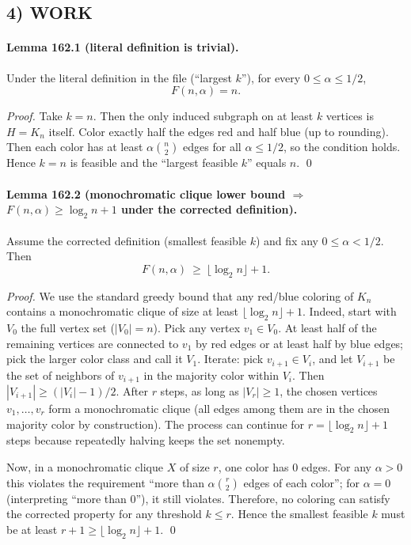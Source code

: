 \subsection*{4) WORK}
\paragraph{Lemma 162.1 (literal definition is trivial).}
Under the literal definition in the file (``largest $k$''), for every $0\le\alpha\le 1/2$,
\[
F(n,\alpha)=n.
\]

\textit{Proof.}
Take $k=n$. Then the only induced subgraph on at least $k$ vertices is $H=K_n$ itself.
Color exactly half the edges red and half blue (up to rounding). Then each color has at least $\alpha\binom{n}{2}$ edges for all $\alpha\le 1/2$, so the condition holds. Hence $k=n$ is feasible and the ``largest feasible $k$'' equals $n$. \qed

\paragraph{Lemma 162.2 (monochromatic clique lower bound $\Rightarrow$ $F(n,\alpha)\ge \log_2 n+1$ under the corrected definition).}
Assume the corrected definition (smallest feasible $k$) and fix any $0\le\alpha<1/2$. Then
\[
F(n,\alpha)\ \ge\ \lfloor \log_2 n\rfloor+1.
\]

\textit{Proof.}
We use the standard greedy bound that any red/blue coloring of $K_n$ contains a monochromatic clique of size at least $\lfloor \log_2 n\rfloor+1$.
Indeed, start with $V_0$ the full vertex set ($|V_0|=n$). Pick any vertex $v_1\in V_0$. At least half of the remaining vertices are connected to $v_1$ by red edges or at least half by blue edges; pick the larger color class and call it $V_1$.
Iterate: pick $v_{i+1}\in V_i$, and let $V_{i+1}$ be the set of neighbors of $v_{i+1}$ in the majority color within $V_i$.
Then $|V_{i+1}|\ge (|V_i|-1)/2$.
After $r$ steps, as long as $|V_r|\ge 1$, the chosen vertices $v_1,\dots,v_r$ form a monochromatic clique (all edges among them are in the chosen majority color by construction).
The process can continue for $r=\lfloor \log_2 n\rfloor+1$ steps because repeatedly halving keeps the set nonempty.

Now, in a monochromatic clique $X$ of size $r$, one color has $0$ edges. For any $\alpha>0$ this violates the requirement ``more than $\alpha\binom{r}{2}$ edges of each color''; for $\alpha=0$ (interpreting ``more than $0$''), it still violates.
Therefore, no coloring can satisfy the corrected property for any threshold $k\le r$.
Hence the smallest feasible $k$ must be at least $r+1\ge \lfloor \log_2 n\rfloor+1$. \qed

